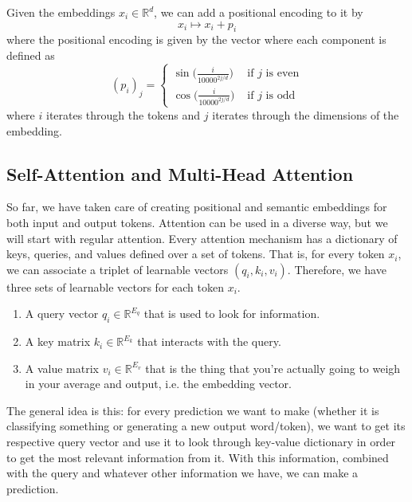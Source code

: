 \documentclass{article}
\begin{document}
    \begin{definition}
      Given the embeddings $x_i \in \mathbb{R}^{d}$, we can add a positional encoding to it by 
      \[x_i \mapsto x_i + p_i\]
      where the positional encoding is given by the vector where each component is defined as 
      \begin{equation} 
        (p_i)_j =  \begin{cases} 
            \sin \big( \frac{i}{10000^{2j/d}} \big) & \text{ if } j \text{ is even} \\ 
            \cos \big( \frac{i}{10000^{2j/d}} \big) & \text{ if } j \text{ is odd}
        \end{cases}
      \end{equation}
      where $i$ iterates through the tokens and $j$ iterates through the dimensions of the embedding. 
    \end{definition}

  \subsection{Self-Attention and Multi-Head Attention}

    So far, we have taken care of creating positional and semantic embeddings for both input and output tokens. Attention can be used in a diverse way, but we will start with regular attention. Every attention mechanism has a dictionary of keys, queries, and values defined over a set of tokens. That is, for every token $x_i$, we can associate a triplet of learnable vectors $(q_i, k_i, v_i)$. Therefore, we have three sets of learnable vectors for each token $x_i$. 
    \begin{enumerate} 
      \item A query vector $q_i \in \mathbb{R}^{E_q}$ that is used to look for information. 
      \item A key matrix $k_i \in \mathbb{R}^{E_k}$ that interacts with the query. 
      \item A value matrix $v_i \in \mathbb{R}^{E_v}$ that is the thing that you're actually going to weigh in your average and output, i.e. the embedding vector.
    \end{enumerate}
    The general idea is this: for every prediction we want to make (whether it is classifying something or generating a new output word/token), we want to get its respective query vector and use it to look through key-value dictionary in order to get the most relevant information from it. With this information, combined with the query and whatever other information we have, we can make a prediction. 
\end{document}
